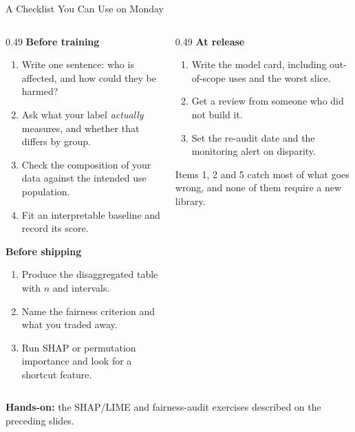\begin{frame}{A Checklist You Can Use on Monday}

    \begin{columns}[T]
        \begin{column}{0.49\textwidth}
            \textbf{Before training}
            \begin{enumerate}\scriptsize
                \setlength\itemsep{0.28em}
                \item Write one sentence: who is affected, and how could they be harmed?
                \item Ask what your label \emph{actually} measures, and whether that differs by
                      group.
                \item Check the composition of your data against the intended use population.
                \item Fit an interpretable baseline and record its score.
            \end{enumerate}

            \vspace{0.6em}
            \textbf{Before shipping}
            \begin{enumerate}\scriptsize
                \setlength\itemsep{0.28em}
                \setcounter{enumi}{4}
                \item Produce the disaggregated table with $n$ and intervals.
                \item Name the fairness criterion and what you traded away.
                \item Run SHAP or permutation importance and look for a shortcut feature.
            \end{enumerate}
        \end{column}
        \begin{column}{0.49\textwidth}
            \textbf{At release}
            \begin{enumerate}\scriptsize
                \setlength\itemsep{0.28em}
                \setcounter{enumi}{7}
                \item Write the model card, including out-of-scope uses and the worst slice.
                \item Get a review from someone who did not build it.
                \item Set the re-audit date and the monitoring alert on disparity.
            \end{enumerate}

            \vspace{1.0em}
            \begin{tcolorbox}[colback=raiGreen!5, colframe=raiGreen!60, boxrule=0.7pt]
                \scriptsize
                Items 1, 2 and 5 catch most of what goes wrong, and none of them require a new
                library.
            \end{tcolorbox}
        \end{column}
    \end{columns}

    \vspace{0.8em}
    \centering
    \scriptsize \textbf{Hands-on:} the SHAP/LIME and fairness-audit exercises described on the
    preceding slides.
\end{frame}
